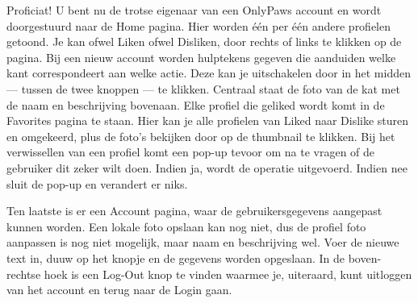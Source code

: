 \documentclass{report}
\begin{document}
Proficiat! U bent nu de trotse eigenaar van een OnlyPaws account en wordt doorgestuurd naar de Home pagina.
Hier worden één per één andere profielen getoond. Je kan ofwel Liken ofwel Disliken, door rechts of links te klikken op de pagina. 
Bij een nieuw account worden hulptekens gegeven die aanduiden welke kant correspondeert aan welke actie. Deze kan je uitschakelen door in het midden --- tussen de twee knoppen --- te klikken.
Centraal staat de foto van de kat met de naam en beschrijving bovenaan.
Elke profiel die geliked wordt komt in de Favorites pagina te staan. Hier kan je alle profielen van Liked naar Dislike sturen en omgekeerd, plus de foto's bekijken door op de thumbnail te klikken.
Bij het verwissellen van een profiel komt een pop-up tevoor om na te vragen of de gebruiker dit zeker wilt doen. Indien ja, wordt de operatie uitgevoerd. Indien nee sluit de pop-up en verandert er niks.

Ten laatste is er een Account pagina, waar de gebruikersgegevens aangepast kunnen worden. Een lokale foto opslaan kan nog niet, dus de profiel foto aanpassen is nog niet mogelijk, maar naam en beschrijving wel.
Voer de nieuwe text in, duuw op het knopje en de gegevens worden opgeslaan.
In de boven-rechtse hoek is een Log-Out knop te vinden waarmee je, uiteraard, kunt uitloggen van het account en terug naar de Login gaan.
\end{document}
